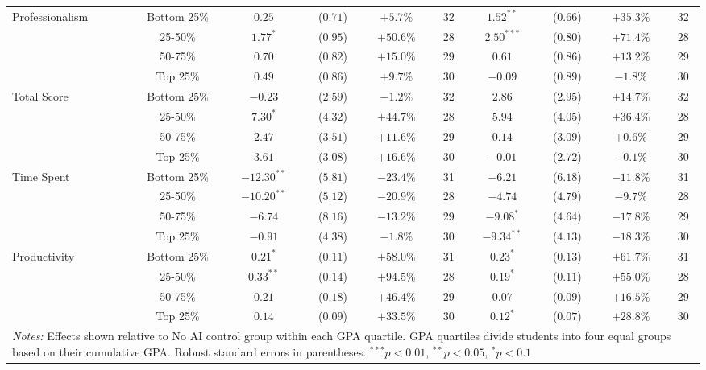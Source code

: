 \begin{table}[!htbp]
\begin{tabular}{lccccccccc}
\hline
\multirow{4}{*}{Professionalism} & Bottom 25\% & $0.25$ & ($0.71$) & $+5.7\%$ & 32 & $1.52^{**}$ & ($0.66$) & $+35.3\%$ & 32 \\
& 25-50\% & $1.77^{*}$ & ($0.95$) & $+50.6\%$ & 28 & $2.50^{***}$ & ($0.80$) & $+71.4\%$ & 28 \\
& 50-75\% & $0.70$ & ($0.82$) & $+15.0\%$ & 29 & $0.61$ & ($0.86$) & $+13.2\%$ & 29 \\
& Top 25\% & $0.49$ & ($0.86$) & $+9.7\%$ & 30 & $-0.09$ & ($0.89$) & $-1.8\%$ & 30 \\
\hline
\multirow{4}{*}{Total Score} & Bottom 25\% & $-0.23$ & ($2.59$) & $-1.2\%$ & 32 & $2.86$ & ($2.95$) & $+14.7\%$ & 32 \\
& 25-50\% & $7.30^{*}$ & ($4.32$) & $+44.7\%$ & 28 & $5.94$ & ($4.05$) & $+36.4\%$ & 28 \\
& 50-75\% & $2.47$ & ($3.51$) & $+11.6\%$ & 29 & $0.14$ & ($3.09$) & $+0.6\%$ & 29 \\
& Top 25\% & $3.61$ & ($3.08$) & $+16.6\%$ & 30 & $-0.01$ & ($2.72$) & $-0.1\%$ & 30 \\
\hline
\multirow{4}{*}{Time Spent} & Bottom 25\% & $-12.30^{**}$ & ($5.81$) & $-23.4\%$ & 31 & $-6.21$ & ($6.18$) & $-11.8\%$ & 31 \\
& 25-50\% & $-10.20^{**}$ & ($5.12$) & $-20.9\%$ & 28 & $-4.74$ & ($4.79$) & $-9.7\%$ & 28 \\
& 50-75\% & $-6.74$ & ($8.16$) & $-13.2\%$ & 29 & $-9.08^{*}$ & ($4.64$) & $-17.8\%$ & 29 \\
& Top 25\% & $-0.91$ & ($4.38$) & $-1.8\%$ & 30 & $-9.34^{**}$ & ($4.13$) & $-18.3\%$ & 30 \\
\hline
\multirow{4}{*}{Productivity} & Bottom 25\% & $0.21^{*}$ & ($0.11$) & $+58.0\%$ & 31 & $0.23^{*}$ & ($0.13$) & $+61.7\%$ & 31 \\
& 25-50\% & $0.33^{**}$ & ($0.14$) & $+94.5\%$ & 28 & $0.19^{*}$ & ($0.11$) & $+55.0\%$ & 28 \\
& 50-75\% & $0.21$ & ($0.18$) & $+46.4\%$ & 29 & $0.07$ & ($0.09$) & $+16.5\%$ & 29 \\
& Top 25\% & $0.14$ & ($0.09$) & $+33.5\%$ & 30 & $0.12^{*}$ & ($0.07$) & $+28.8\%$ & 30 \\
\hline
\multicolumn{10}{p{0.95\linewidth}}{\footnotesize \textit{Notes:} Effects shown relative to No AI control group within each GPA quartile. GPA quartiles divide students into four equal groups based on their cumulative GPA. Robust standard errors in parentheses. $^{***}p<0.01$, $^{**}p<0.05$, $^{*}p<0.1$}
\end{tabular}
\end{table}
